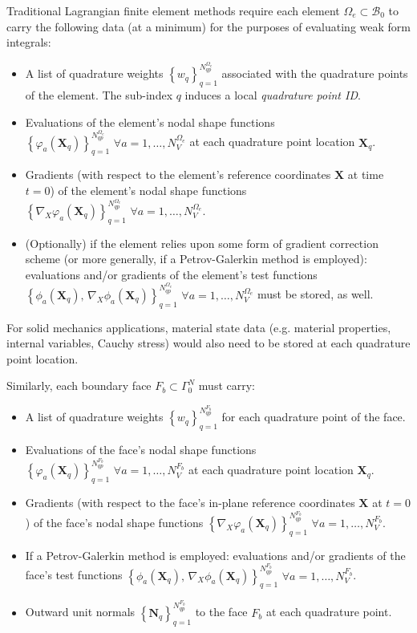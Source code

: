 	Traditional Lagrangian finite element methods require each element $\Omega_e \subset \mathcal{B}_0$ to carry the following data (at a minimum) for the purposes of evaluating weak form integrals:
	\begin{itemize}
		\item A list of quadrature weights $\left\{ w_q \right\}_{q=1}^{N^{\Omega_e}_{qp}}$ associated with the quadrature points of the element. The sub-index $q$ induces a local \textit{quadrature point ID}.
		\item Evaluations of the element's nodal shape functions $\left\{ \varphi_a (\mathbf{X}_q) \right\}_{q=1}^{N^{\Omega_e}_{qp}} \, \, \forall a = 1, \ldots, N^{\Omega_e}_V$ at each quadrature point location $\mathbf{X}_q$.
		\item Gradients (with respect to the element's reference coordinates $\mathbf{X}$ at time $t = 0$) of the element's nodal shape functions $\left\{ \nabla_X \varphi_a (\mathbf{X}_q) \right\}_{q=1}^{N^{\Omega_e}_{qp}} \, \, \forall a = 1, \ldots, N^{\Omega_e}_V$.
		\item (Optionally) if the element relies upon some form of gradient correction scheme (or more generally, if a Petrov-Galerkin method is employed): evaluations and/or gradients of the element's test functions $\left\{ \phi_a (\mathbf{X}_q), \, \nabla_X \phi_a (\mathbf{X}_q) \right\}_{q=1}^{N^{\Omega_e}_{qp}} \, \, \forall a = 1, \ldots, N^{\Omega_e}_V$ must be stored, as well.
	\end{itemize}
	For solid mechanics applications, material state data (e.g. material properties, internal variables, Cauchy stress) would also need to be stored at each quadrature point location.
	
	Similarly, each boundary face $F_b \subset \Gamma^N_0$ must carry:
	\begin{itemize}
		\item A list of quadrature weights $\left\{ w_q \right\}_{q=1}^{N^{F_b}_{qp}}$ for each quadrature point of the face.
		\item Evaluations of the face's nodal shape functions $\left\{ \varphi_a (\mathbf{X}_q) \right\}_{q=1}^{N^{F_b}_{qp}} \, \, \forall a = 1, \ldots, N^{F_b}_V$ at each quadrature point location $\mathbf{X}_q$.
		\item Gradients (with respect to the face's in-plane reference coordinates $\mathbf{X}$ at $t = 0$) of the face's nodal shape functions $\left\{ \nabla_X \varphi_a (\mathbf{X}_q) \right\}_{q=1}^{N^{F_b}_{qp}} \, \, \forall a = 1, \ldots, N^{F_b}_V$.
		\item If a Petrov-Galerkin method is employed: evaluations and/or gradients of the face's test functions $\left\{ \phi_a (\mathbf{X}_q), \, \nabla_X \phi_a (\mathbf{X}_q) \right\}_{q=1}^{N^{F_b}_{qp}} \, \, \forall a = 1, \ldots, N^{F_b}_V$.
		\item Outward unit normals $\left\{ \mathbf{N}_q \right\}_{q=1}^{N^{F_b}_{qp}}$ to the face $F_b$ at each quadrature point.
	\end{itemize}
	

